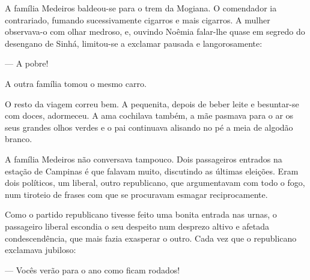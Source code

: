 {

A família Medeiros baldeou-se para o trem da
Mogiana. O comendador ia contrariado, fumando sucessivamente
cigarros e mais cigarros. A mulher observava-o com olhar medroso, e,
ouvindo Noêmia falar-lhe quase em segredo do desengano de
Sinhá, limitou-se a exclamar pausada e langorosamente:

--- A pobre!

A outra família tomou o mesmo carro.

O resto da viagem correu bem. A pequenita, depois de beber leite
e besuntar-se com doces, adormeceu. A ama cochilava também, a
mãe pasmava para o ar os seus grandes olhos verdes e o pai
continuava alisando no pé a meia de algodão branco.

A família Medeiros não conversava tampouco. Dois
passageiros entrados na estação de Campinas é que falavam muito,
discutindo as últimas eleições. Eram dois políticos,
um liberal, outro republicano, que argumentavam com todo o fogo, num
tiroteio de frases com que se procuravam esmagar reciprocamente.

Como o partido republicano tivesse feito uma bonita entrada nas
urnas, o passageiro liberal escondia o seu despeito num
desprezo altivo e afetada condescendência, que
mais fazia exasperar o outro. Cada vez que o republicano exclamava
jubiloso:


--- Vocês verão para o ano como ficam rodados!

\enlargethispage{1\baselineskip}


}
